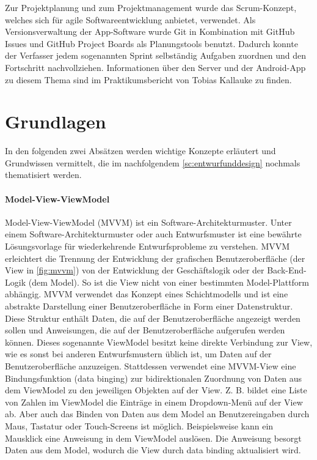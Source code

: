 \documentclass[notables, nomenclature, oneside, 150]{HSMW-Thesis}
\begin{document}
		Zur Projektplanung und zum Projektmanagement wurde das Scrum-Konzept, welches sich für agile Softwareentwicklung anbietet, verwendet. Als Versionsverwaltung der App-Software wurde Git in Kombination mit GitHub Issues und GitHub Project Boards als Planungstools benutzt. Dadurch konnte der Verfasser jedem sogenannten Sprint selbständig Aufgaben zuordnen und den Fortschritt nachvollziehen. Informationen über den Server und der Android-App zu diesem Thema sind im Praktikumsbericht von Tobias Kallauke zu finden.	

	\section{Grundlagen}
		In den folgenden zwei Absätzen werden wichtige Konzepte erläutert und Grundwissen vermittelt, die im nachfolgendem \autoref{sc:entwurfunddesign} nochmals thematisiert werden.
		
		\vspace{-5mm}
		\paragraph*{Model-View-ViewModel}
			Model-View-ViewModel (MVVM)  ist ein Software-Architekturmuster. Unter einem Software-Architekturmuster oder auch Entwurfsmuster ist eine bewährte Lösungsvorlage für wiederkehrende Entwurfsprobleme zu verstehen. MVVM erleichtert die Trennung der Entwicklung der grafischen Benutzeroberfläche (der View in \autoref{fig:mvvm}) von der Entwicklung der Geschäftslogik oder der Back-End-Logik (dem Model). So ist die View nicht von einer bestimmten Model-Plattform abhängig. MVVM verwendet das Konzept eines Schichtmodells und ist eine abstrakte Darstellung einer Benutzeroberfläche in Form einer Datenstruktur. Diese Struktur enthält Daten, die auf der Benutzeroberfläche angezeigt werden sollen und Anweisungen, die auf der Benutzeroberfläche aufgerufen werden können. Dieses sogenannte ViewModel besitzt keine direkte Verbindung zur View, wie es sonst bei anderen Entwurfsmustern üblich ist, um Daten auf der Benutzeroberfläche anzuzeigen. Stattdessen verwendet eine MVVM-View eine Bindungsfunktion (data binging) zur bidirektionalen Zuordnung von Daten aus dem ViewModel zu den jeweiligen Objekten auf der View. Z. B. bildet eine Liste von Zahlen im ViewModel die Einträge in einem Dropdown-Menü auf der View ab. Aber auch das Binden von Daten aus dem Model an Benutzereingaben durch Maus, Tastatur oder Touch-Screens ist möglich. Beispielsweise kann ein Mausklick eine Anweisung in dem ViewModel auslösen. Die Anweisung besorgt Daten aus dem Model, wodurch die View durch data binding aktualisiert wird. \cite{papa_fundamental_2011} \cite{freeman_pro_2017} \cite{bragge_model-view-controller_2013}	
			
\end{document}
